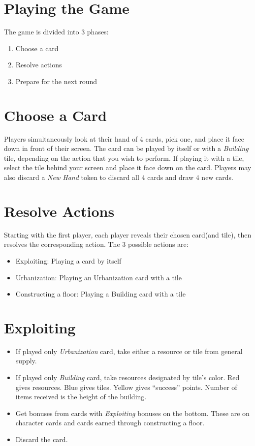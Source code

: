 \documentclass[10pt]{article}
\newenvironment{enumerateCustom}
{\begin{enumerate}
  \setlength{\itemsep}{1pt}
  \setlength{\parskip}{0pt}
  \setlength{\parsep}{0pt}}
{\end{enumerate}}
\newenvironment{itemizeCustom}
{\begin{itemize}
  \setlength{\itemsep}{1pt}
  \setlength{\parskip}{0pt}
  \setlength{\parsep}{0pt}}
{\end{itemize}}
\begin{document}
\begin{multicols*}{2}
\section*{Playing the Game}
The game is divided into 3 phases:
\begin{enumerateCustom}
	\item Choose a card
	\item Resolve actions
	\item Prepare for the next round
\end{enumerateCustom}

\section*{Choose a Card}
Players simultaneously look at their hand of 4 cards, pick one, and place it face down in front of their screen. The card can be played by itself or with a \emph{Building} tile, depending on the action that you wish to perform. If playing it with a tile, select the tile behind your screen and place it face down on the card. Players may also discard a \emph{New Hand} token to discard all 4 cards and draw 4 new cards.

\section*{Resolve Actions}
Starting with the first player, each player reveals their chosen card(and tile), then resolves the corresponding action. The 3 possible actions are:
\begin{itemizeCustom}
	\item Exploiting: Playing a card by itself
	\item Urbanization: Playing an Urbanization card with a tile
	\item Constructing a floor: Playing a Building card with a tile
\end{itemizeCustom}

\section*{Exploiting}
\begin{itemizeCustom}
	\item If played only \emph{Urbanization} card, take either a resource or tile from general supply.
	\item If played only \emph{Building} card, take resources designated by tile's color. Red gives resources. Blue gives tiles. Yellow gives ``success'' points. Number of items received is the height of the building.
	\item Get bonuses from cards with \emph{Exploiting} bonuses on the bottom. These are on character cards and cards earned through constructing a floor.
	\item Discard the card.
\end{itemizeCustom}


\end{multicols*}
\end{document}
